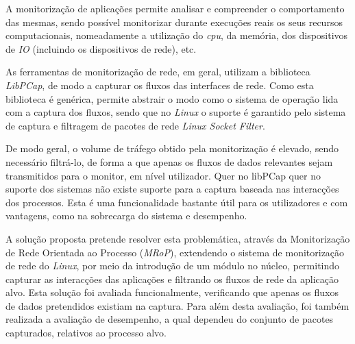 \resumo 

A monitorização de aplicações permite analisar e compreender o comportamento das mesmas, sendo possível monitorizar durante execuções reais os seus recursos computacionais, nomeadamente a utilização do \textit{cpu}, da memória, dos dispositivos de \textit{IO} (incluindo os dispositivos de rede), etc. 

As ferramentas de monitorização de rede, em geral, utilizam a biblioteca \textit{LibPCap}, de modo a capturar os fluxos das interfaces de rede.
Como esta biblioteca é genérica, permite abstrair o modo como o sistema de operação lida com a captura dos fluxos, sendo que no \textit{Linux} o suporte é garantido pelo sistema de captura e filtragem de pacotes de rede \textit{Linux Socket Filter}.


De modo geral, o volume de tráfego obtido pela monitorização é elevado, sendo necessário filtrá-lo, de forma a que apenas os fluxos de dados relevantes sejam transmitidos para o monitor, em nível utilizador.
Quer no libPCap quer no suporte dos sistemas não existe suporte para a captura baseada nas interacções dos processos.
Esta é uma funcionalidade bastante útil para os utilizadores e com vantagens, como na sobrecarga do sistema e desempenho.

A solução proposta pretende resolver esta problemática, através da Monitorização de Rede Orientada ao Processo (\textit{MRoP}), extendendo o sistema de monitorização de rede do \textit{Linux}, por meio da introdução de um módulo no núcleo, permitindo capturar as interacções das aplicações e filtrando os fluxos de rede da aplicação alvo.
Esta solução foi avaliada funcionalmente, verificando que apenas os fluxos de dados pretendidos existiam na captura.
Para além desta avaliação, foi também realizada a avaliação de desempenho, a qual dependeu do conjunto de pacotes capturados, relativos ao processo alvo.






